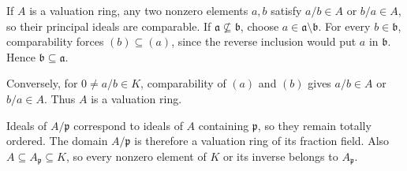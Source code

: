 If $A$ is a valuation ring, any two nonzero elements $a,b$ satisfy $a/b\in A$ or $b/a\in A$, so their principal ideals are comparable. If $\mathfrak{a}\nsubseteq\mathfrak{b}$, choose $a\in\mathfrak{a}\setminus\mathfrak{b}$. For every $b\in\mathfrak{b}$, comparability forces $(b)\subseteq(a)$, since the reverse inclusion would put $a$ in $\mathfrak{b}$. Hence $\mathfrak{b}\subseteq\mathfrak{a}$.

Conversely, for $0\neq a/b\in K$, comparability of $(a)$ and $(b)$ gives $a/b\in A$ or $b/a\in A$. Thus $A$ is a valuation ring.

Ideals of $A/\mathfrak{p}$ correspond to ideals of $A$ containing $\mathfrak{p}$, so they remain totally ordered. The domain $A/\mathfrak{p}$ is therefore a valuation ring of its fraction field. Also $A\subseteq A_{\mathfrak{p}}\subseteq K$, so every nonzero element of $K$ or its inverse belongs to $A_{\mathfrak{p}}$.
